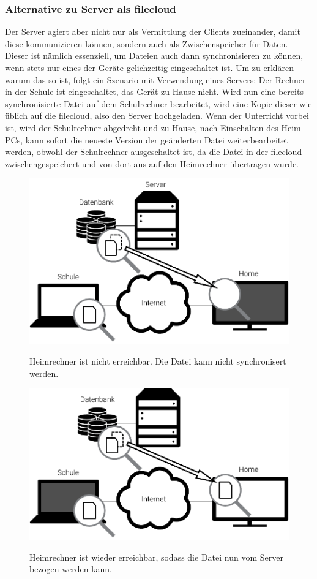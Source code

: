 \subsubsection{Alternative zu Server als \gls{filecloud}}
Der Server agiert aber nicht nur als Vermittlung der Clients zueinander, damit diese
kommunizieren können, sondern auch als Zwischenspeicher für Daten. Dieser ist nämlich
essenziell, um Dateien auch dann synchronisieren zu können, wenn stets nur eines der
Geräte gelichzeitig eingeschaltet ist. Um zu erklären warum das
so ist, folgt ein Szenario mit Verwendung eines Servers:
Der Rechner in der Schule ist eingeschaltet, das Gerät zu Hause nicht. Wird nun
eine bereits synchronisierte Datei auf dem Schulrechner bearbeitet, wird eine Kopie dieser wie
üblich auf die \gls{filecloud}, also den Server hochgeladen. Wenn der Unterricht vorbei ist,
wird der Schulrechner abgedreht und zu Hause, nach Einschalten des Heim-PCs, kann sofort die neueste Version der
geänderten Datei weiterbearbeitet werden, obwohl der Schulrechner ausgeschaltet ist, da die Datei in der \gls{filecloud}
zwischengespeichert und von dort aus auf den Heimrechner übertragen wurde.
\begin{figure}[htb]
	\centering
  \includegraphics[]{images/dropbox_temp_1}
	\label{dropbox_temp_1}
  \caption{Heimrechner ist nicht erreichbar. Die Datei kann nicht synchronisert werden.}
\end{figure}

\begin{figure}[htb]
	\centering
  \includegraphics[]{images/dropbox_temp_2}
	\label{dropbox_temp_2}
  \caption{Heimrechner ist wieder erreichbar, sodass die Datei nun vom Server
	bezogen werden kann.}
\end{figure}

